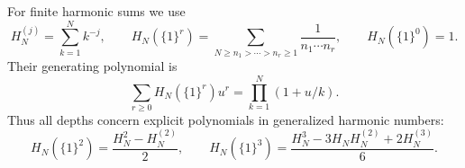 For finite harmonic sums we use
\[
 H_N^{(j)}=\sum_{k=1}^N k^{-j},\qquad
 H_N(\{1\}^r)=
 \sum_{N\geq n_1>\cdots>n_r\geq1}\frac1{n_1\cdots n_r},
 \qquad H_N(\{1\}^0)=1.
\]
Their generating polynomial is
\[
 \sum_{r\geq0}H_N(\{1\}^r)u^r
      =\prod_{k=1}^N(1+u/k).
\]
Thus all depths concern explicit polynomials in generalized harmonic
numbers:
\[
 H_N(\{1\}^2)=\frac{H_N^2-H_N^{(2)}}2,\qquad
 H_N(\{1\}^3)=\frac{H_N^3-3H_NH_N^{(2)}+2H_N^{(3)}}6.
\]
